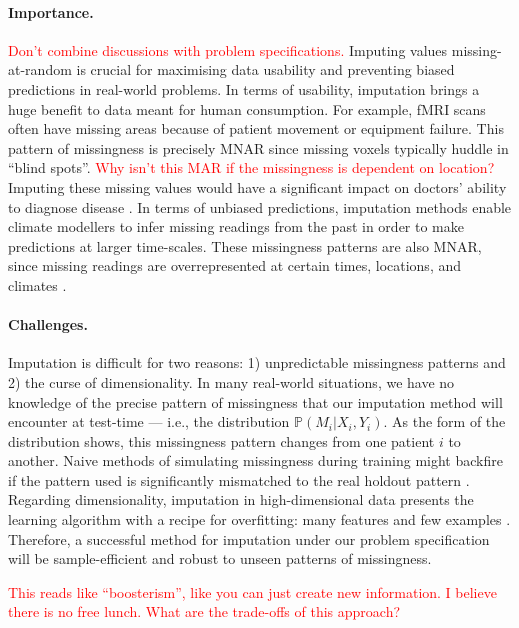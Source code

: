 \documentclass[a4paper,12pt,twoside,openright]{report}
\newcommand{\crit}[1]{\textcolor{red}{#1}}
\begin{document}
\paragraph{Importance.} \crit{Don't combine discussions with problem specifications.} Imputing values missing-at-random is crucial for maximising data usability and preventing biased predictions in real-world problems. In terms of usability, imputation brings a huge benefit to data meant for human consumption. For example, fMRI scans often have missing areas because of patient movement or equipment failure. This pattern of missingness is precisely MNAR since missing voxels typically huddle in ``blind spots''. \crit{Why isn't this MAR if the missingness is dependent on location?} Imputing these missing values would have a significant impact on doctors' ability to diagnose disease \parencite{vadenMultipleImputationMissing2012}. In terms of unbiased predictions, imputation methods enable climate modellers to infer missing readings from the past in order to make predictions at larger time-scales. These missingness patterns are also MNAR, since missing readings are overrepresented at certain times, locations, and climates \parencite{kadowArtificialIntelligenceReconstructs2020}. 

\paragraph{Challenges.} Imputation is difficult for two reasons: 1) unpredictable missingness patterns and 2) the curse of dimensionality. In many real-world situations, we have no knowledge of the precise pattern of missingness that our imputation method will encounter at test-time --- i.e., the distribution $\mathbb{P} (M_i | X_i, Y_i)$. As the form of the distribution shows, this missingness pattern changes from one patient $i$ to another. Naive methods of simulating missingness during training might backfire if the pattern used is significantly mismatched to the real holdout pattern \parencite{schaferMissingDataOur2002}. Regarding dimensionality, imputation in high-dimensional data presents the learning algorithm with a recipe for overfitting: many features and few examples \parencite{azurMultipleImputationChained2011}. Therefore, a successful method for imputation under our problem specification will be sample-efficient and robust to unseen patterns of missingness. 

\crit{This reads like ``boosterism'', like you can just create new information. I believe there is no free lunch. What are the trade-offs of this approach?}
\end{document}
